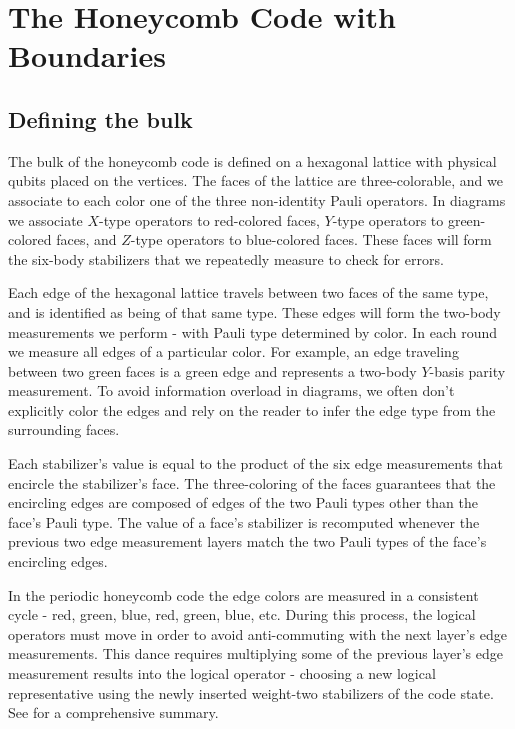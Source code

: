 \documentclass[onecolumn,unpublished,a4paper]{quantumarticle}
\theoremstyle{definition}
\theoremstyle{definition}
\theoremstyle{definition}
\begin{document}
\section{The Honeycomb Code with Boundaries}
\label{sec:boundaries}

\subsection{Defining the bulk}

The bulk of the honeycomb code is defined on a hexagonal lattice with physical qubits placed on the vertices.  
The faces of the lattice are three-colorable, and we associate to each color one of the three non-identity Pauli operators.  
In diagrams we associate $X$-type operators to red-colored faces, $Y$-type operators to green-colored faces, and $Z$-type operators to blue-colored faces.  
These faces will form the six-body stabilizers that we repeatedly measure to check for errors. 

Each edge of the hexagonal lattice travels between two faces of the same type, and is identified as being of that same type.
These edges will form the two-body measurements we perform - with Pauli type determined by color.
In each round we measure all edges of a particular color.
For example, an edge traveling between two green faces is a green edge and represents a two-body $Y$-basis parity measurement.
To avoid information overload in diagrams, we often don't explicitly color the edges and rely on the reader to infer the edge type from the surrounding faces.

Each stabilizer's value is equal to the product of the six edge measurements that encircle the stabilizer's face.
The three-coloring of the faces guarantees that the encircling edges are composed of edges of the two Pauli types other than the face's Pauli type.
The value of a face's stabilizer is recomputed whenever the previous two edge measurement layers match the two Pauli types of the face's encircling edges.

In the periodic honeycomb code the edge colors are measured in a consistent cycle - red, green, blue, red, green, blue, etc.
During this process, the logical operators must move in order to avoid anti-commuting with the next layer's edge measurements.  
This dance requires multiplying some of the previous layer's edge measurement results into the logical operator - choosing a new logical representative using the newly inserted weight-two stabilizers of the code state.
See \cite{gidney2021honeycombmemory} for a comprehensive summary.
\end{document}
